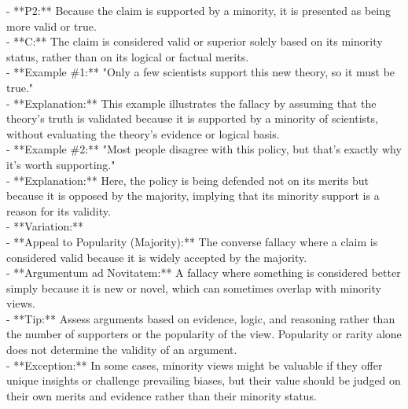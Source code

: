 \documentclass[a4paper,12pt,single,pdftex]{scrbook}
\begin{document}
    
        - **P2:** Because the claim is supported by a minority, it is presented as being more valid or true.
    \\

    
        - **C:** The claim is considered valid or superior solely based on its minority status, rather than on its logical or factual merits.
    \\

    
      - **Example \#1:** "Only a few scientists support this new theory, so it must be true."
    \\

    
      - **Explanation:** This example illustrates the fallacy by assuming that the theory’s truth is validated because it is supported by a minority of scientists, without evaluating the theory’s evidence or logical basis.
    \\

    
      - **Example \#2:** "Most people disagree with this policy, but that’s exactly why it’s worth supporting."
    \\

    
      - **Explanation:** Here, the policy is being defended not on its merits but because it is opposed by the majority, implying that its minority support is a reason for its validity.
    \\

    
      - **Variation:**
    \\

    
        - **Appeal to Popularity (Majority):** The converse fallacy where a claim is considered valid because it is widely accepted by the majority.
    \\

    
        - **Argumentum ad Novitatem:** A fallacy where something is considered better simply because it is new or novel, which can sometimes overlap with minority views.
    \\

    
      - **Tip:** Assess arguments based on evidence, logic, and reasoning rather than the number of supporters or the popularity of the view. Popularity or rarity alone does not determine the validity of an argument.
    \\

    
      - **Exception:** In some cases, minority views might be valuable if they offer unique insights or challenge prevailing biases, but their value should be judged on their own merits and evidence rather than their minority status.
    \\
\end{document}
